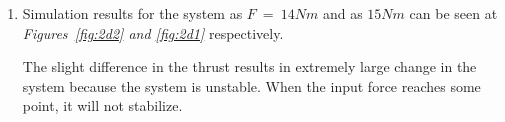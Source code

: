 \documentclass[a4paper,12pt]{article}
\begin{document}
\begin{enumerate}
\begin{enumerate}
			
				
			\item Simulation results for the system as $F~=~14Nm$ and as $15Nm$ can be seen at \textit{Figures~\ref{fig:2d2} and \ref{fig:2d1}} respectively.
			
			The slight difference in the thrust results in extremely large change in the system because the system is unstable. When the input force reaches some point, it will not stabilize.
			
				
				

\end{enumerate}
\end{enumerate}
\end{document}
